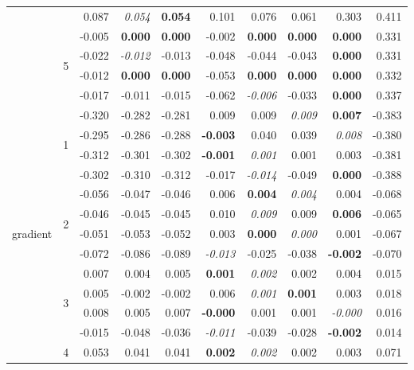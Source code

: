 \documentclass[authoryear, review, 11pt]{elsarticle}
\begin{document}
\begin{table}
\begin{center}
{\begin{tabular}{ccrrrrrrrr}
   &  & 0.087 & \emph{0.054} & \textbf{0.054} & 0.101 & 0.076 & 0.061 & 0.303 & 0.411 \\ 
  \cline{3-10}
   & \multirow{4}{*}{5} & -0.005 & \textbf{0.000} & \textbf{0.000} & -0.002 & \textbf{0.000} & \textbf{0.000} & \textbf{0.000} & 0.331 \\ 
   &  & -0.022 & \emph{-0.012} & -0.013 & -0.048 & -0.044 & -0.043 & \textbf{0.000} & 0.331 \\ 
   &  & -0.012 & \textbf{0.000} & \textbf{0.000} & -0.053 & \textbf{0.000} & \textbf{0.000} & \textbf{0.000} & 0.332 \\ 
   &  & -0.017 & -0.011 & -0.015 & -0.062 & \emph{-0.006} & -0.033 & \textbf{0.000} & 0.337 \\ 
  \hline
  \multirow{20}{*}{gradient} & \multirow{4}{*}{1} & -0.320 & -0.282 & -0.281 & 0.009 & 0.009 & \emph{0.009} & \textbf{0.007} & -0.383 \\ 
   &  & -0.295 & -0.286 & -0.288 & \textbf{-0.003} & 0.040 & 0.039 & \emph{0.008} & -0.380 \\ 
   &  & -0.312 & -0.301 & -0.302 & \textbf{-0.001} & \emph{0.001} & 0.001 & 0.003 & -0.381 \\ 
   &  & -0.302 & -0.310 & -0.312 & -0.017 & \emph{-0.014} & -0.049 & \textbf{0.000} & -0.388 \\ 
  \cline{3-10}
   & \multirow{4}{*}{2} & -0.056 & -0.047 & -0.046 & 0.006 & \textbf{0.004} & \emph{0.004} & 0.004 & -0.068 \\ 
   &  & -0.046 & -0.045 & -0.045 & 0.010 & \emph{0.009} & 0.009 & \textbf{0.006} & -0.065 \\ 
   &  & -0.051 & -0.053 & -0.052 & 0.003 & \textbf{0.000} & \emph{0.000} & 0.001 & -0.067 \\ 
   &  & -0.072 & -0.086 & -0.089 & \emph{-0.013} & -0.025 & -0.038 & \textbf{-0.002} & -0.070 \\ 
  \cline{3-10}
   & \multirow{4}{*}{3} & 0.007 & 0.004 & 0.005 & \textbf{0.001} & \emph{0.002} & 0.002 & 0.004 & 0.015 \\ 
   &  & 0.005 & -0.002 & -0.002 & 0.006 & \emph{0.001} & \textbf{0.001} & 0.003 & 0.018 \\ 
   &  & 0.008 & 0.005 & 0.007 & \textbf{-0.000} & 0.001 & 0.001 & \emph{-0.000} & 0.016 \\ 
   &  & -0.015 & -0.048 & -0.036 & \emph{-0.011} & -0.039 & -0.028 & \textbf{-0.002} & 0.014 \\ 
  \cline{3-10}
   & \multirow{4}{*}{4} & 0.053 & 0.041 & 0.041 & \textbf{0.002} & \emph{0.002} & 0.002 & 0.003 & 0.071 \\ 

\end{tabular}}
\end{center}
\end{table}
\end{document}
